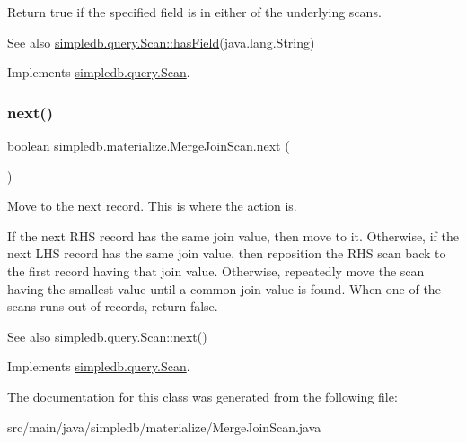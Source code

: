 Return true if the specified field is in either of the underlying scans. \begin{DoxySeeAlso}{See also}
\hyperlink{interfacesimpledb_1_1query_1_1Scan_a8f4ccf13eed0bed983c928e9b998fe5c}{simpledb.\+query.\+Scan\+::has\+Field}(java.\+lang.\+String) 
\end{DoxySeeAlso}


Implements \hyperlink{interfacesimpledb_1_1query_1_1Scan_a8f4ccf13eed0bed983c928e9b998fe5c}{simpledb.\+query.\+Scan}.

\mbox{\label{classsimpledb_1_1materialize_1_1MergeJoinScan_a557b6b51af330fe0180f639246fa7135}} 
\subsubsection{\texorpdfstring{next()}{next()}}
{\footnotesize\ttfamily boolean simpledb.\+materialize.\+Merge\+Join\+Scan.\+next (\begin{DoxyParamCaption}{ }\end{DoxyParamCaption})\hspace{0.3cm}{\ttfamily [inline]}}

Move to the next record. This is where the action is. 

If the next R\+HS record has the same join value, then move to it. Otherwise, if the next L\+HS record has the same join value, then reposition the R\+HS scan back to the first record having that join value. Otherwise, repeatedly move the scan having the smallest value until a common join value is found. When one of the scans runs out of records, return false. \begin{DoxySeeAlso}{See also}
\hyperlink{interfacesimpledb_1_1query_1_1Scan_a5fc77b7c76d91f89f6c09ac4f15ef351}{simpledb.\+query.\+Scan\+::next()} 
\end{DoxySeeAlso}


Implements \hyperlink{interfacesimpledb_1_1query_1_1Scan_a5fc77b7c76d91f89f6c09ac4f15ef351}{simpledb.\+query.\+Scan}.



The documentation for this class was generated from the following file\+:\begin{DoxyCompactItemize}
\item 
src/main/java/simpledb/materialize/Merge\+Join\+Scan.\+java\end{DoxyCompactItemize}
